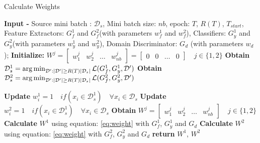 \begin{algorithm}
    
	\caption{Calculate Weights}
	\begin{algorithmic}[1]
	    \State \textbf{Input -} Source mini batch : $\mathcal{D}_s$, Mini batch size: $nb$, epoch: $T$, $R(T)$, $T_{start}$,  Feature Extractors: $G_{f}^1$ and $G_{f}^2$(with parameters $w_{f}^1$ and $w_{f}^2$), Classifiers: $G_{y}^1$ and $G_{y}^2$(with parameters $w_{y}^1$ and $w_{y}^2$), Domain Discriminator: $G_d$ (with parameters $w_d$);
	    \State \textbf{Initialize:} $W^j = \begin{bmatrix} w_{1}^j & w_{2}^j & \dots & w_{nb}^j \end{bmatrix} =  \begin{bmatrix} 0 & 0 & \dots & 0 \end{bmatrix} \quad j \in \{1, 2\} $
		\State \textbf{Obtain} $\mathcal{D}_{s}^1 = \operatorname*{arg\,min}_{\mathcal{D}':|\mathcal{D}'|\geq R(T)|\mathcal{D}_{s}|} \mathcal{L}(G_{f}^1, G_{y}^1, \mathcal{D}')$ 
	    \State \textbf{Obtain} $\mathcal{D}_{s}^2 = \operatorname*{arg\,min}_{\mathcal{D}':|\mathcal{D}'|\geq R(T)|\mathcal{D}_{s}|} \mathcal{L}(G_{f}^2, G_{y}^2, \mathcal{D}')$
		
		\State \textbf{Update} $w_{i}^1 = 1 \quad if(x_i \in \mathcal{D}_{s}^1) \quad \forall x_i \in \mathcal{D}_s$
		\State \textbf{Update} $w_{i}^2 = 1 \quad if(x_i \in \mathcal{D}_{s}^1) \quad \forall x_i \in \mathcal{D}_s$
		\State \textbf{Obtain} $W^j = \begin{bmatrix} w_{1}^j & w_{2}^j & \dots & w_{nb}^j \end{bmatrix} \quad j \in \{1, 2\} $
		\EndIf
		\State \textbf{Calculate} $W^1$ using equation: \ref{eq:weight} with $G_{f}^1$, $G_{y}^1$ and $G_d$
		\State \textbf{Calculate} $W^2$ using equation: \ref{eq:weight} with $G_{f}^2$, $G_{y}^2$ and $G_d$
		\EndIf
		\State \textbf{return} $W^1$, $W^2$
	\end{algorithmic} 
\label{algo: cal_weight}
\end{algorithm}

